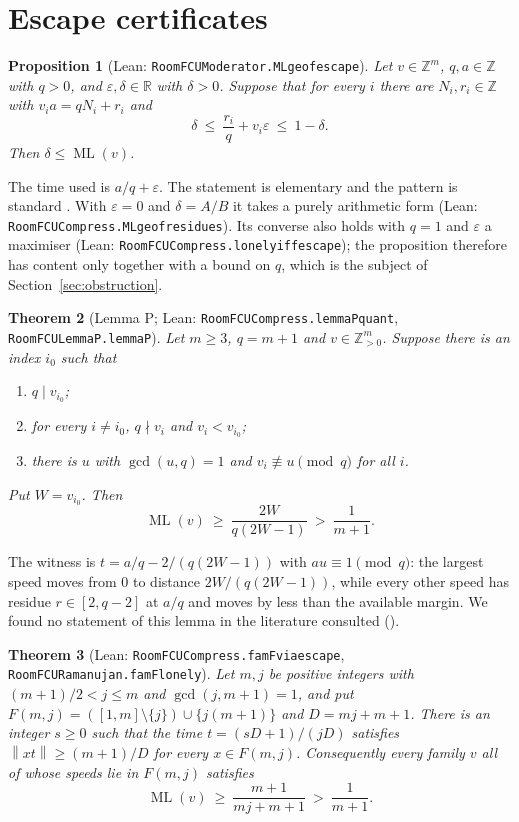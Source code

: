 \documentclass[11pt]{amsart}
\theoremstyle{plain}
\newtheorem{theorem}{Theorem}[section]
\newtheorem{proposition}[theorem]{Proposition}
\theoremstyle{definition}
\theoremstyle{remark}
\newcommand{\nrm}[1]{\left\lVert #1 \right\rVert}
\newcommand{\ML}{\operatorname{ML}}
\newcommand{\Z}{\mathbb{Z}}
\newcommand{\R}{\mathbb{R}}
\newcommand{\lean}[1]{{\def\_{\textunderscore\allowbreak}\def\.{.\allowbreak}\texttt{#1}}}
\begin{document}
\section{Escape certificates}\label{sec:escape}

\begin{proposition}[Lean: \lean{RoomFCUModerator\.ML\_ge\_of\_escape}]\label{prop:escape}
Let $v\in\Z^m$, $q,a\in\Z$ with $q>0$, and $\varepsilon,\delta\in\R$ with $\delta>0$. Suppose that
for every $i$ there are $N_i,r_i\in\Z$ with $v_ia=qN_i+r_i$ and
\[
  \delta\ \le\ \frac{r_i}{q}+v_i\varepsilon\ \le\ 1-\delta .
\]
Then $\delta\le\ML(v)$.
\end{proposition}

The time used is $a/q+\varepsilon$. The statement is elementary and the pattern is standard
\cite{kravitz}. With $\varepsilon=0$ and $\delta=A/B$ it takes a purely arithmetic form (Lean:
\lean{RoomFCUCompress\.ML\_ge\_of\_residues}). Its converse also holds with $q=1$ and
$\varepsilon$ a maximiser (Lean: \lean{RoomFCUCompress\.lonely\_iff\_escape}); the proposition
therefore has content only together with a bound on $q$, which is the subject of
Section~\ref{sec:obstruction}.

\begin{theorem}[Lemma P; Lean: \lean{RoomFCUCompress\.lemmaP\_quant}, \lean{RoomFCULemmaP\.lemmaP}]\label{thm:lemmaP}
Let $m\ge3$, $q=m+1$ and $v\in\Z_{>0}^m$. Suppose there is an index $i_0$ such that
\begin{enumerate}
\item $q\mid v_{i_0}$;
\item for every $i\ne i_0$, $q\nmid v_i$ and $v_i<v_{i_0}$;
\item there is $u$ with $\gcd(u,q)=1$ and $v_i\not\equiv u\pmod q$ for all $i$.
\end{enumerate}
Put $W=v_{i_0}$. Then
\[
  \ML(v)\ \ge\ \frac{2W}{q(2W-1)}\ >\ \frac1{m+1}.
\]
\end{theorem}

The witness is $t=a/q-2/(q(2W-1))$ with $au\equiv1\pmod q$: the largest speed moves from $0$ to
distance $2W/(q(2W-1))$, while every other speed has residue $r\in[2,q-2]$ at $a/q$ and moves by
less than the available margin. We found no statement of this lemma in the literature consulted
(\cite{kravitz,zhang,ps}).

\begin{theorem}[Lean: \lean{RoomFCUCompress\.famF\_via\_escape}, \lean{RoomFCURamanujan\.famF\_lonely}]\label{thm:famF}
Let $m,j$ be positive integers with $(m+1)/2<j\le m$ and $\gcd(j,m+1)=1$, and put
$F(m,j)=([1,m]\setminus\{j\})\cup\{j(m+1)\}$ and $D=mj+m+1$. There is an integer $s\ge0$ such that
the time $t=(sD+1)/(jD)$ satisfies $\nrm{xt}\ge(m+1)/D$ for every $x\in F(m,j)$. Consequently every
family $v$ all of whose speeds lie in $F(m,j)$ satisfies
\[
  \ML(v)\ \ge\ \frac{m+1}{mj+m+1}\ >\ \frac1{m+1}.
\]
\end{theorem}
\end{document}
